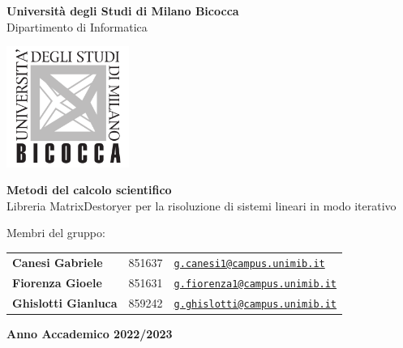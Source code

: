 \begin{center}
	{\LARGE \textbf{Università degli Studi di Milano Bicocca}} \\
	\vspace{0.2cm}
	{\Large {Dipartimento di Informatica}} \\ 
	\vspace{1cm}
	
	\includegraphics[width=4cm]{figures/unimib-logo.png} \\
	\vspace{0.4cm}
	
	{\huge \textbf{Metodi del calcolo scientifico}} \\ 
	\Large{Libreria MatrixDestoryer per la risoluzione di sistemi lineari in modo iterativo}
	\vspace{3cm}
\end{center}
\vspace{2cm}

\noindent \large{Membri del gruppo:} 

\begin{tabular}{@{}lll}
	\textbf{Canesi Gabriele} & 851637 & \href{mailto:g.canesi1@campus.unimib.it}{\texttt{g.canesi1@campus.unimib.it}}\\
	\textbf{Fiorenza Gioele} & 851631 & \href{mailto:g.fiorenza1@campus.unimib.it}{\texttt{g.fiorenza1@campus.unimib.it}}\\
	\textbf{Ghislotti Gianluca} & 859242 & \href{mailto:g.ghislotti@campus.unimib.it}{\texttt{g.ghislotti@campus.unimib.it}}\\
\end{tabular}

\vfill
\begin{center}
	\large{\textbf{Anno Accademico 2022/2023}}
\end{center}



